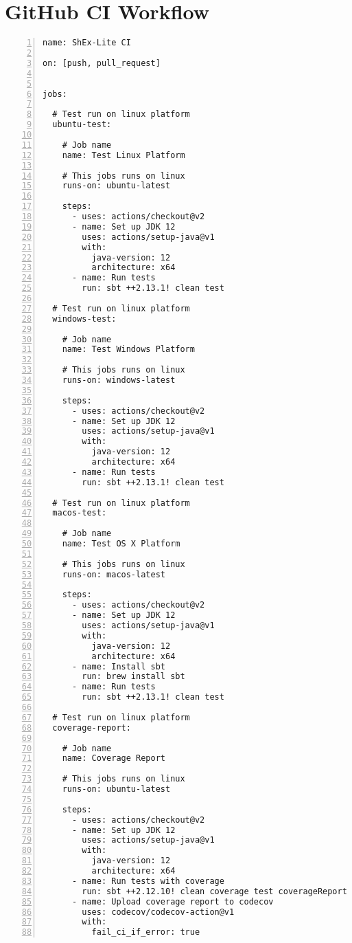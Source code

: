 \chapter{GitHub CI Workflow}\label{ch:github}
\begin{lstlisting}[numbers=left,basicstyle=\ttfamily\scriptsize]
name: ShEx-Lite CI

on: [push, pull_request]


jobs:

  # Test run on linux platform
  ubuntu-test:

    # Job name
    name: Test Linux Platform

    # This jobs runs on linux
    runs-on: ubuntu-latest

    steps:
      - uses: actions/checkout@v2
      - name: Set up JDK 12
        uses: actions/setup-java@v1
        with:
          java-version: 12
          architecture: x64
      - name: Run tests
        run: sbt ++2.13.1! clean test

  # Test run on linux platform
  windows-test:

    # Job name
    name: Test Windows Platform

    # This jobs runs on linux
    runs-on: windows-latest

    steps:
      - uses: actions/checkout@v2
      - name: Set up JDK 12
        uses: actions/setup-java@v1
        with:
          java-version: 12
          architecture: x64
      - name: Run tests
        run: sbt ++2.13.1! clean test

  # Test run on linux platform
  macos-test:

    # Job name
    name: Test OS X Platform

    # This jobs runs on linux
    runs-on: macos-latest

    steps:
      - uses: actions/checkout@v2
      - name: Set up JDK 12
        uses: actions/setup-java@v1
        with:
          java-version: 12
          architecture: x64
      - name: Install sbt
        run: brew install sbt
      - name: Run tests
        run: sbt ++2.13.1! clean test

  # Test run on linux platform
  coverage-report:

    # Job name
    name: Coverage Report

    # This jobs runs on linux
    runs-on: ubuntu-latest

    steps:
      - uses: actions/checkout@v2
      - name: Set up JDK 12
        uses: actions/setup-java@v1
        with:
          java-version: 12
          architecture: x64
      - name: Run tests with coverage
        run: sbt ++2.12.10! clean coverage test coverageReport
      - name: Upload coverage report to codecov
        uses: codecov/codecov-action@v1
        with:
          fail_ci_if_error: true
\end{lstlisting}
